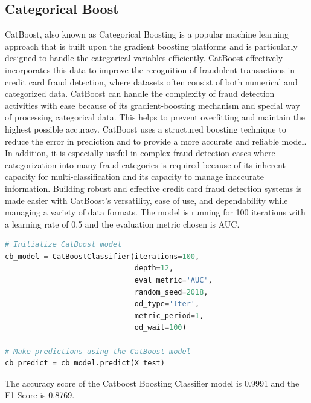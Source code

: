 \clearpage
 \subsection{Categorical Boost}

 CatBoost, also known as Categorical Boosting is a popular machine learning approach that is built upon the gradient boosting platforms and is particularly designed to handle the categorical variables efficiently. CatBoost effectively incorporates this data to improve the recognition of fraudulent transactions in credit card fraud detection, where datasets often consist of both numerical and categorized data. CatBoost can handle the complexity of fraud detection activities with ease because of its gradient-boosting mechanism and special way of processing categorical data. This helps to prevent overfitting and maintain the highest possible accuracy. CatBoost uses a structured boosting technique to reduce the error in prediction and to provide a more accurate and reliable model. In addition, it is especially useful in complex fraud detection cases where categorization into many fraud categories is required because of its inherent capacity for multi-classification and its capacity to manage inaccurate information. Building robust and effective credit card fraud detection systems is made easier with CatBoost's versatility, ease of use, and dependability while managing a variety of data formats. The model is running for 100 iterations with a learning rate of 0.5 and the evaluation metric chosen is AUC.

 \begin{lstlisting}[language=Python, caption={Creating and training Catboost model}, label=list:python_code_ex]
# Initialize CatBoost model
cb_model = CatBoostClassifier(iterations=100,
                              depth=12,
                              eval_metric='AUC',
                              random_seed=2018,
                              od_type='Iter',
                              metric_period=1,
                              od_wait=100)

# Make predictions using the CatBoost model
cb_predict = cb_model.predict(X_test)
\end{lstlisting}
\clearpage

 The accuracy score of the Catboost Boosting Classifier model is 0.9991 and the F1 Score is 0.8769.  


